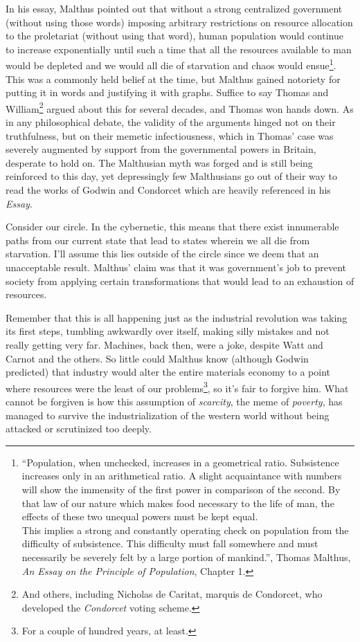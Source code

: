 In his essay, Malthus pointed out that without a strong centralized government
(without using those words) imposing arbitrary restrictions on resource
allocation to the proletariat (without using that word), human population would
continue to increase exponentially until such a time that all the resources
available to man would be depleted and we would all die of starvation and chaos
would ensue\footnote{``Population, when unchecked, increases in a geometrical
ratio. Subsistence increases only in an arithmetical ratio. A slight
acquaintance with numbers will show the immensity of the f\hbox{}irst power in
comparison of the second.  By that law of our nature which makes food necessary
to the life of man, the ef\hbox{}fects of these two unequal powers must be kept
equal.\\ This implies a strong and constantly operating check on population 
from the dif\hbox{}f\hbox{}iculty of subsistence. This dif\hbox{}f\hbox{}iculty
must fall somewhere and must necessarily be severely felt by a large portion of
mankind.'', Thomas Malthus, \textit{An Essay on the Principle of Population},
Chapter 1.}. This was a commonly held belief at the time, but Malthus gained
notoriety for putting it in words and justifying it with graphs.
Suf\hbox{}f\hbox{}ice to say Thomas and William\footnote{And others, including
Nicholas de Caritat, marquis de Condorcet, who developed the \textit{Condorcet}
voting scheme.} argued about this for several decades, and Thomas won hands
down. As in any philosophical debate, the validity of the arguments hinged not
on their truthfulness, but on their memetic infectiousness, which in Thomas'
case was severely augmented by support from the governmental powers in Britain,
desperate to hold on. The Malthusian myth was forged and is still being
reinforced to this day, yet depressingly few Malthusians go out of their way to
read the works of Godwin and Condorcet which are heavily referenced in his
\textit{Essay}.

Consider our circle. In the cybernetic, this means that there exist innumerable
paths from our current state that lead to states wherein we all die from
starvation. I'll assume this lies outside of the circle since we deem that an
unacceptable result. Malthus' claim was that it was government's job to prevent
society from applying certain transformations that would lead to an exhaustion
of resources.

Remember that this is all happening just as the industrial revolution was 
taking its f\hbox{}irst steps, tumbling awkwardly over itself, making silly
mistakes and not really getting very far. Machines, back then, were a joke,
despite Watt and Carnot and the others. So little could Malthus know (although
Godwin predicted) that industry would alter the entire materials economy to a
point where resources were the least of our problems\footnote{For a couple of
hundred years, at least.}, so it's fair to forgive him. What cannot be forgiven
is how this assumption of \textit{scarcity}, the meme of \textit{poverty}, has
managed to survive the industrialization of the western world without being
attacked or scrutinized too deeply.

